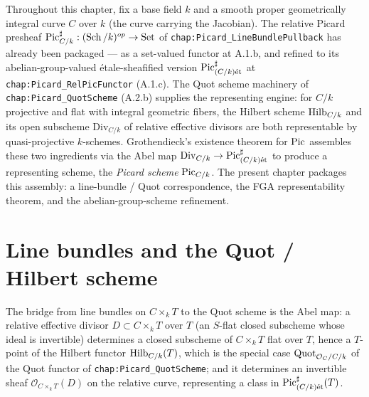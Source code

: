 Throughout this chapter, fix a base field \(k\) and a smooth proper geometrically
integral curve \(C\) over \(k\) (the curve carrying the Jacobian). The relative
Picard presheaf \(\operatorname{Pic}^\sharp_{C/k} : (\operatorname{Sch}/k)^{op} \to \mathrm{Set}\) of
\texttt{chap:Picard_LineBundlePullback} has already been packaged --- as a
set-valued functor at A.1.b, and refined to its abelian-group-valued
\'etale-sheafified version \(\operatorname{Pic}^\sharp_{(C/k)\mathrm{\acute{e}t}}\) at
\texttt{chap:Picard_RelPicFunctor} (A.1.c). The Quot scheme machinery of
\texttt{chap:Picard_QuotScheme} (A.2.b) supplies the representing engine: for
\(C/k\) projective and flat with integral geometric fibers, the Hilbert scheme
\(\operatorname{Hilb}_{C/k}\) and its open subscheme \(\mathrm{Div}_{C/k}\) of relative effective
divisors are both representable by quasi-projective \(k\)-schemes. Grothendieck's
existence theorem for \(\operatorname{Pic}\) assembles these two ingredients via the Abel
map \(\mathrm{Div}_{C/k} \to \operatorname{Pic}^\sharp_{(C/k)\mathrm{\acute{e}t}}\) to produce a representing scheme,
the \emph{Picard scheme} \(\operatorname{Pic}_{C/k}\). The present chapter packages this
assembly: a line-bundle / Quot correspondence, the FGA representability
theorem, and the abelian-group-scheme refinement.


\section{Line bundles and the Quot / Hilbert scheme}
\label{sec:fga_pic_line_bundle_quot}

The bridge from line bundles on \(C \times_k T\) to the Quot scheme is the
Abel map: a relative effective divisor \(D \subset C \times_k T\) over \(T\)
(an \(S\)-flat closed subscheme whose ideal is invertible) determines a closed
subscheme of \(C \times_k T\) flat over \(T\), hence a \(T\)-point of the Hilbert
functor \(\operatorname{Hilb}_{C/k}(T)\), which is the special case \(\operatorname{Quot}_{\mathcal{O}_C/C/k}\)
of the Quot functor of \texttt{chap:Picard_QuotScheme}; and it determines an
invertible sheaf \(\mathcal{O}_{C \times_k T}(D)\) on the relative curve,
representing a class in \(\operatorname{Pic}^\sharp_{(C/k)\mathrm{\acute{e}t}}(T)\).


